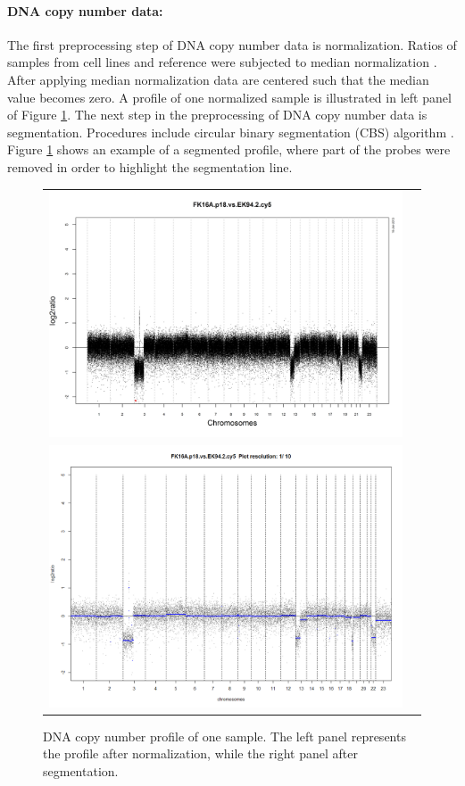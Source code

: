 \paragraph{DNA copy number data:}

The first preprocessing step of DNA copy number data is normalization. Ratios of samples from cell lines and reference were subjected to median normalization \cite{Wiel2007}. After applying median normalization data are centered such that the median value becomes zero. A profile of one normalized sample is illustrated in left panel of Figure \ref{fig:CGHnormalization}. The next step in the preprocessing of DNA copy number data is segmentation. Procedures include circular binary segmentation (CBS) algorithm \cite{Olshen2004}. Figure \ref{fig:CGHnormalization} shows an example of a segmented profile, where part of the probes were removed in order to highlight the segmentation line.

\begin{figure}[h!]
\centering
\begin{tabular}{cc}
\includegraphics[scale=0.35]{noWavesCorrected.jpeg}\\
\includegraphics[scale=0.21]{CGH_preproc2.jpeg}  
\end{tabular}
\caption{DNA copy number profile of one sample. The left panel represents the profile after normalization, while the right panel after segmentation.}
\label{fig:CGHnormalization}
\end{figure}

